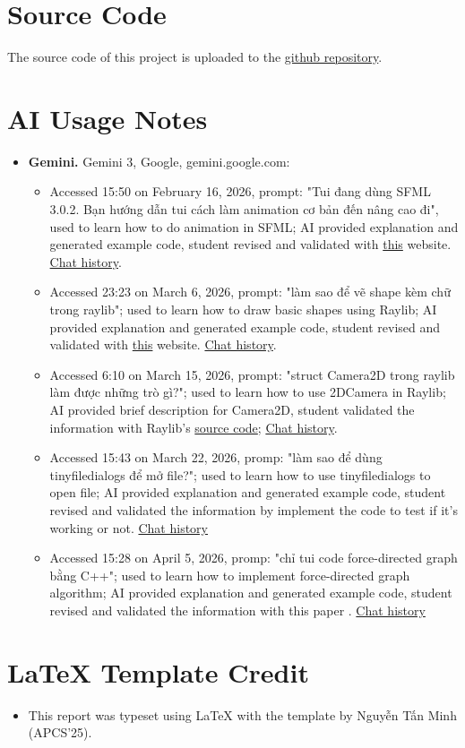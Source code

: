\section{Source Code}
The source code of this project is uploaded to the \href{https://github.com/Gasmask-Chan/CS163-Project-Data-Structure-Visualization}{github repository}.

\section{AI Usage Notes}
\begin{itemize}
    \item \textbf{Gemini.} Gemini 3, Google, gemini.google.com:
    \begin{itemize}
        \item Accessed 15:50 on February 16, 2026, prompt: "Tui đang dùng SFML 3.0.2. Bạn hướng dẫn tui cách làm animation cơ bản đến nâng cao đi", used to learn how to do animation in SFML; AI provided explanation and generated example code, student revised and validated with \href{https://github.com/SFML/SFML/wiki/Tutorials}{this} website. \href{https://gemini.google.com/share/e2b67996a0e3}{Chat history}.
        \item Accessed 23:23 on March 6, 2026, prompt: "làm sao để vẽ shape kèm chữ trong raylib"; used to learn how to draw basic shapes using Raylib; AI provided explanation and generated example code, student revised and validated with \href{https://www.raylib.com/examples.html}{this} website. \href{https://gemini.google.com/share/3d1d2518b12d}{Chat history}.
        \item Accessed 6:10 on March 15, 2026, prompt: "struct Camera2D trong raylib làm được những trò gì?"; used to learn how to use 2DCamera in Raylib; AI provided brief description for Camera2D, student validated the information with Raylib's \href{https://github.com/raysan5/raylib}{source code}; \href{https://gemini.google.com/share/375659e8b39e}{Chat history}.
        \item Accessed 15:43 on March 22, 2026, promp: "làm sao để dùng tinyfiledialogs để mở file?"; used to learn how to use tinyfiledialogs to open file; AI provided explanation and generated example code, student revised and validated the information by implement the code to test if it's working or not. \href{https://gemini.google.com/share/72ed59e6d264}{Chat history}
        \item Accessed 15:28 on April 5, 2026, promp: "chỉ tui code force-directed graph bằng C++"; used to learn how to implement force-directed graph algorithm; AI provided explanation and generated example code, student revised and validated the information with this paper \cite{fruchterman1991graph}. \href{https://gemini.google.com/share/947b621a8c1b}{Chat history}
    \end{itemize}
\end{itemize}

\section{\LaTeX{} Template Credit}
\begin{itemize}
    \item This report was typeset using \LaTeX{} with the template by Nguyễn Tấn Minh (APCS'25).
\end{itemize}
